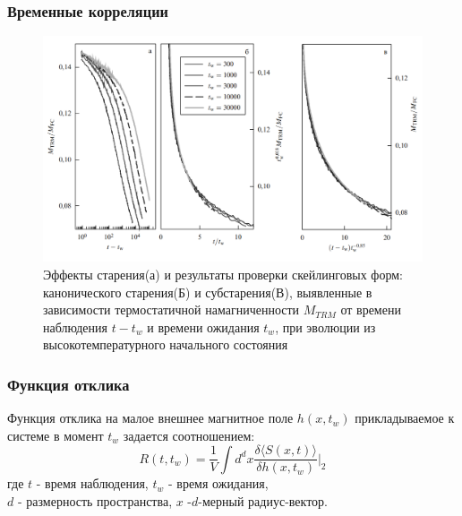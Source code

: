 \documentclass[pdf,unicode]{beamer}
\begin{document}
\begin{frame}
    \frametitle{Временные корреляции}

  \begin{figure}
\includegraphics[width=1\textwidth]{Image1.png}
	\caption{\scriptsize Эффекты старения(а) и результаты проверки скейлинговых форм: канонического старения(Б) и субстарения(В), выявленные в зависимости термостатичной намагниченности $M_{TRM}$ от времени наблюдения $t - t_w$ и времени ожидания $t_w$, при эволюции из высокотемпературного начального состояния}

\end{figure}
\end{frame}
\begin{frame}

\frametitle{Функция отклика}
Функция отклика на малое внешнее магнитное поле $h(x,t_w)$ прикладываемое к системе в момент $t_w$ задается соотношением:
\begin{equation*}
R(t,t_w) = \frac{1}{V} {\int d^d x \frac{\delta \langle S(x,t)\rangle}{\delta h(x,t_w)} }\bigg|_2
\end{equation*}
где $t$ - время наблюдения, $t_w$ - время ожидания, \\$d$ - размерность пространства, $x$ -$d$-мерный радиус-вектор.
\end{frame}



\end{document}
